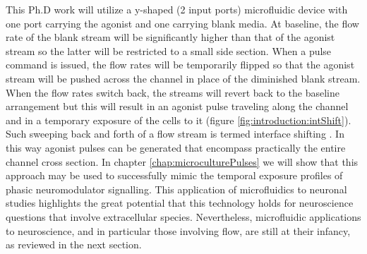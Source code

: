     This Ph.D work will utilize a y-shaped (2 input ports) microfluidic device with one port carrying the agonist and one carrying blank media. At baseline, the flow rate of the blank stream will be significantly higher than that of the agonist stream so the latter will be restricted to a small side section. When a pulse command is issued, the flow rates will be temporarily flipped so that the agonist stream will be pushed across the channel in place of the diminished blank stream. When the flow rates switch back, the streams will revert back to the baseline arrangement but this will result in an agonist pulse traveling along the channel and in a temporary exposure of the cells to it (figure \ref{fig:introduction:intShift}). Such sweeping back and forth of a flow stream is termed interface shifting \cite{bae2009rapid}. In this way agonist pulses can be generated that encompass practically the entire channel cross section. In chapter \ref{chap:microculturePulses} we will show that this approach may be used to successfully mimic the temporal exposure profiles of phasic neuromodulator signalling. This application of microfluidics to neuronal studies highlights the great potential that this technology holds for neuroscience questions that involve extracellular species. Nevertheless, microfluidic applications to neuroscience, and in particular those involving flow, are still at their infancy, as reviewed in the next section.

